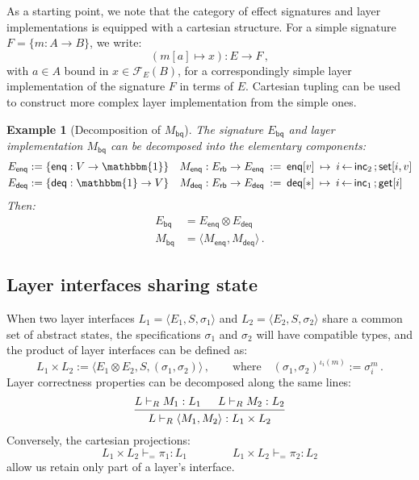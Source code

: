 \documentclass[11pt,oneside,draft]{book}
\newtheorem{example}[theorem]{Example}
\theoremstyle{definition}
\newcommand{\kw}[1]{\ensuremath{ \mathsf{#1} }}
\begin{document}
As a starting point,
we note that the category of effect signatures
and layer implementations
is equipped with a cartesian structure.
For a simple signature $F = \{ m : A \rightarrow B \}$,
we write:
\[ (m[a] \mapsto x) : E \rightarrow F \,, \]
with $a \in A$ bound in $x \in \mathcal{F}_E(B)$,
for a correspondingly simple layer implementation
of the signature $F$ in terms of $E$.
Cartesian tupling can be used to construct more complex
layer implementation from the simple ones.

\begin{example}[Decomposition of $M_\kw{bq}$]
The signature $E_\kw{bq}$ and layer implementation $M_\kw{bq}$
can be decomposed into the elementary components:
\begin{align*}
  E_\kw{enq} &:= \{ \kw{enq} : V \rightarrow \mathbbm{1} \} &
  M_\kw{enq} : E_\kw{rb} \rightarrow E_\kw{enq} \: &:= \:
    \kw{enq}[v] \: \mapsto \:
      i \mathop{\leftarrow} \kw{inc}_2 \mathop{;}
      \kw{set}[i, v] \\
  E_\kw{deq} &:= \{ \kw{deq} : \mathbbm{1} \rightarrow V \} &
  M_\kw{deq} : E_\kw{rb} \rightarrow E_\kw{deq} \: &:= \:
    \kw{deq}[*] \:\mapsto\:
      i \mathop{\leftarrow} \kw{inc}_1 \mathop{;}
      \kw{get}[i]
\end{align*}
Then:
\begin{align*}
  E_\kw{bq} &= E_\kw{enq} \otimes E_\kw{deq} \\
  M_\kw{bq} &= \langle M_\kw{enq}, M_\kw{deq} \rangle \,.
\end{align*}
\end{example}


\subsection{Layer interfaces sharing state} \label{sec:layerprod} %

When two layer interfaces
$L_1 = \langle E_1, S, \sigma_1 \rangle$ and
$L_2 = \langle E_2, S, \sigma_2 \rangle$
share a common set of abstract states,
the specifications $\sigma_1$ and $\sigma_2$
will have compatible types,
and the product of layer interfaces can be defined as:
\[
  L_1 \times L_2 :=
    \langle E_1 \otimes E_2, S, (\sigma_1, \sigma_2) \rangle \,,
  \qquad
  \text{where}
  \quad
  (\sigma_1, \sigma_2)^{\iota_i(m)} := \sigma_i^m \,.
\]
Layer correctness properties can be
decomposed along the same lines:
\[
  \begin{prooftree}
    \hypo{L \vdash_R M_1 : L_1}
    \hypo{L \vdash_R M_2 : L_2}
    \infer2{L \vdash_R \langle M_1, M_2 \rangle : L_1 \times L_2}
  \end{prooftree}
\]
Conversely, the cartesian projections:
\[
   L_1 \times L_2 \vdash_{=} \pi_1 : L_1 \qquad \qquad
   L_1 \times L_2 \vdash_{=} \pi_2 : L_2
\]
allow us retain only part of a layer's interface.
\end{document}

